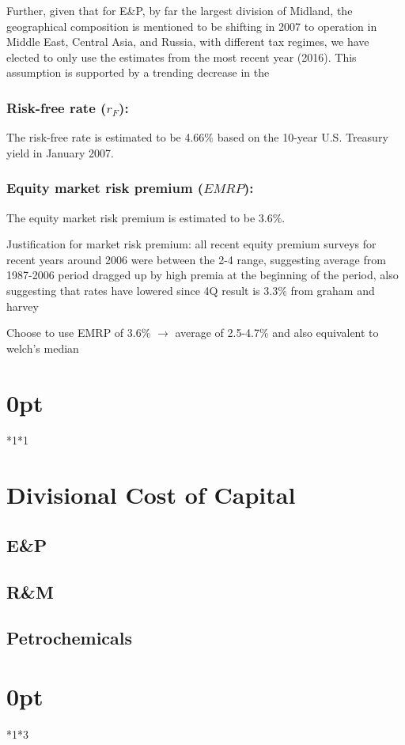 \documentclass{article}
\begin{document}
Further, given that for E\&P, by far the largest division of Midland, the geographical composition is mentioned to be shifting in 2007 to operation in Middle East, Central Asia, and Russia, with different tax regimes, we have elected to only use the estimates from the most recent year (2016). This assumption is supported by a trending decrease in the

\subsubsection*{Risk-free rate ($r_F$):} The risk-free rate is estimated to be 4.66\% based on the 10-year U.S. Treasury yield in January 2007.

\subsubsection*{Equity market risk premium ($EMRP$):} The equity market risk premium is estimated to be 3.6\%.

Justification for market risk premium: all recent equity premium surveys for recent years around 2006  were between the 2-4 range, suggesting average from 1987-2006 period dragged up by high premia at the beginning of the period, also suggesting that rates have lowered since
4Q result is 3.3\% from graham and harvey

Choose to use EMRP of 3.6\% $\rightarrow$ average of 2.5-4.7\% and also equivalent to welch’s median

\titlespacing\section{0pt}{*1}{*1}
\hrulefill
\section{Divisional Cost of Capital}
\subsection{E\&P}
\subsection{R\&M}
\subsection{Petrochemicals}

\titlespacing\section{0pt}{*1}{*3}
\hrulefill
\end{document}
